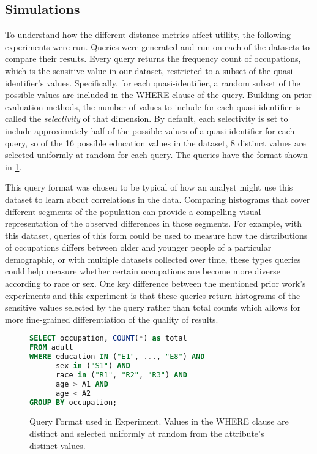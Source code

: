 \subsection{Simulations}
To understand how the different distance metrics affect utility, the following experiments were run. Queries were generated and run on each of the datasets to compare their results. Every query returns the frequency count of occupations, which is the sensitive value in our dataset, restricted to a subset of the quasi-identifier's values. Specifically, for each quasi-identifier, a random subset of the possible values are included in the WHERE clause of the query. Building on prior evaluation methods\cite{xiaoAnatomy}, the number of values to include for each quasi-identifier is called the \emph{selectivity} of that dimension. By default, each selectivity is set to include approximately half of the possible values of a quasi-identifier for each query, so of the 16 possible education values in the dataset, 8 distinct values are selected uniformly at random for each query. The queries have the format shown in \ref{fig:queryFormat}.

This query format was chosen to be typical of how an analyst might use this dataset to learn about correlations in the data. Comparing histograms that cover different segments of the population can provide a compelling visual representation of the observed differences in those segments. For example, with this dataset, queries of this form could be used to measure how the distributions of occupations differs between older and younger people of a particular demographic, or with multiple datasets collected over time, these types queries could help measure whether certain occupations are become more diverse according to race or sex. One key difference between the mentioned prior work's experiments\cite{xiaoAnatomy} and this experiment is that these queries return histograms of the sensitive values selected by the query rather than total counts which allows for more fine-grained differentiation of the quality of results.

\begin{figure}
\begin{lstlisting}[language=SQL]
SELECT occupation, COUNT(*) as total
FROM adult
WHERE education IN ("E1", ..., "E8") AND
      sex in ("S1") AND
      race in ("R1", "R2", "R3") AND
      age > A1 AND
      age < A2
GROUP BY occupation;
\end{lstlisting}
\caption{Query Format used in Experiment. Values in the WHERE clause are distinct and selected uniformly at random from the attribute's distinct values.}
\label{fig:queryFormat}
\end{figure}

